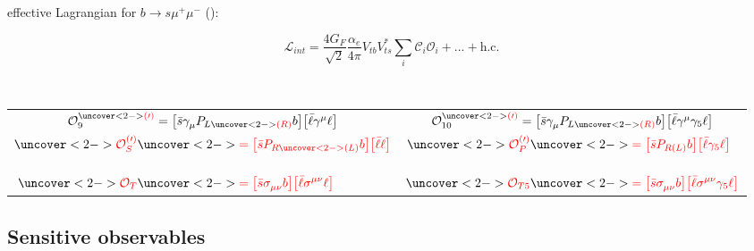 \documentclass[english]{beamer}
\newcommand{\slide}[2][t]{\begin{frame}[#1] \frametitle{\insertsubsectionhead} #2 \end{frame}}
\newcommand{\red}[1]{\textcolor{red}{#1}}
\begin{document}
\slide{

    effective Lagrangian for $ b \to s \mu^+ \mu^- $ (\only<1>{$\mathrm{SM}$}\only<2>{\red{beyond}-$\mathrm{SM}$}): \
    \
    \newline \newline \

    $$ \mathcal{L}_{int} = \frac{4 G_F}{\sqrt{2}} \frac{\alpha_e}{4\pi} V_{tb}^{} V_{ts}^\ast \sum_i \mathcal{C}_i \mathcal{O}_i + ... + \text{h.c.} $$

    ~ \newline

    \begin{center}
      \begin{tabular}{cc}
          \small $ \mathcal{O}_{9} ^{\redsecond{(\prime)}} = \left[\bar{s} \gamma_\mu^{} P_{L\redsecond{(R)}} b\right]\!\left[\bar{\ell} \gamma^\mu \ell\right] $
                & \small $  \mathcal{O}_{10}^{\redsecond{(\prime)}} = \left[\bar{s} \gamma_\mu^{} P_{L\redsecond{(R)}} b\right]\!\left[\bar{\ell} \gamma^\mu \gamma_5 \ell\right] $ \\[1cm]
          \Large $ \begin{aligned}
                \redsecond{\mathcal{O}_S^{(\prime)}}    & \redsecond{= \left[\bar{s} P_{R\redsecond{(L)}} b\right]\!\left[\bar{\ell} \ell\right]} \\[5mm]
                \redsecond{\mathcal{O}_T}               & \redsecond{= \left[\bar{s} \sigma_{\mu\nu}^{} b\right]\!\left[\bar{\ell} \sigma^{\mu\nu} \ell\right] }
          \end{aligned} $ & \Large $ \begin{aligned}
                \redsecond{\mathcal{O}_P^{(\prime)}}    & \redsecond{= \left[\bar{s} P_{R(L)} b\right]\!\left[\bar{\ell} \gamma_5 \ell\right] } \\[5mm]
                \redsecond{\mathcal{O}_{T5}}            & \redsecond{= \left[\bar{s} \sigma_{\mu\nu}^{} b\right]\!\left[\bar{\ell} \sigma^{\mu\nu} \gamma_5 \ell\right] }
          \end{aligned} $
     \end{tabular}
    \end{center}

}

\subsection{Sensitive observables}
\newcommand{\sqrtqsq}{\sqrt{q^2}}
\end{document}
